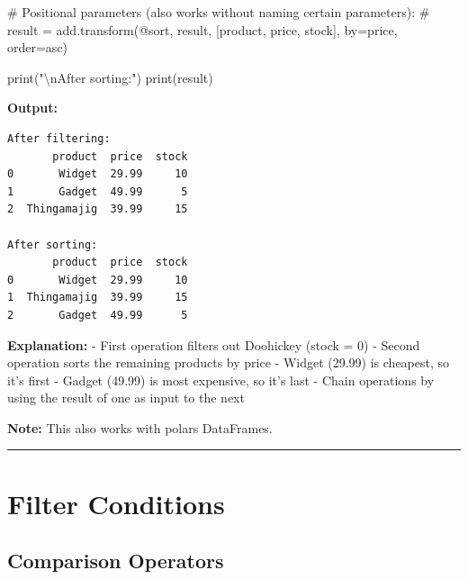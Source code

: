 \documentclass[
  letterpaper,
]{scrbook}
\newenvironment{Shaded}{\begin{snugshade}}{\end{snugshade}}
\newcommand{\BuiltInTok}[1]{\textcolor[rgb]{0.00,0.23,0.31}{#1}}
\newcommand{\CharTok}[1]{\textcolor[rgb]{0.13,0.47,0.30}{#1}}
\newcommand{\CommentTok}[1]{\textcolor[rgb]{0.37,0.37,0.37}{#1}}
\newcommand{\NormalTok}[1]{\textcolor[rgb]{0.00,0.23,0.31}{#1}}
\newcommand{\StringTok}[1]{\textcolor[rgb]{0.13,0.47,0.30}{#1}}
\begin{document}
\begin{Shaded}
\begin{Highlighting}[]
\CommentTok{\# Positional parameters (also works without naming certain parameters):}
\CommentTok{\# result = add.transform(\textquotesingle{}@sort\textquotesingle{}, result, [\textquotesingle{}product\textquotesingle{}, \textquotesingle{}price\textquotesingle{}, \textquotesingle{}stock\textquotesingle{}], by=\textquotesingle{}price\textquotesingle{}, order=\textquotesingle{}asc\textquotesingle{})}

\BuiltInTok{print}\NormalTok{(}\StringTok{"}\CharTok{\textbackslash{}n}\StringTok{After sorting:"}\NormalTok{)}
\BuiltInTok{print}\NormalTok{(result)}
\end{Highlighting}
\end{Shaded}

\textbf{Output:}

\begin{verbatim}
After filtering:
       product  price  stock
0       Widget  29.99     10
1       Gadget  49.99      5
2  Thingamajig  39.99     15

After sorting:
       product  price  stock
0       Widget  29.99     10
1  Thingamajig  39.99     15
2       Gadget  49.99      5
\end{verbatim}

\textbf{Explanation:} - First operation filters out Doohickey (stock =
0) - Second operation sorts the remaining products by price - Widget
(29.99) is cheapest, so it's first - Gadget (49.99) is most expensive,
so it's last - Chain operations by using the result of one as input to
the next

\textbf{Note:} This also works with polars DataFrames.

\begin{center}\rule{0.5\linewidth}{0.5pt}\end{center}

\section{Filter Conditions}\label{filter-conditions}

\subsection{Comparison Operators}\label{comparison-operators}
\end{document}
